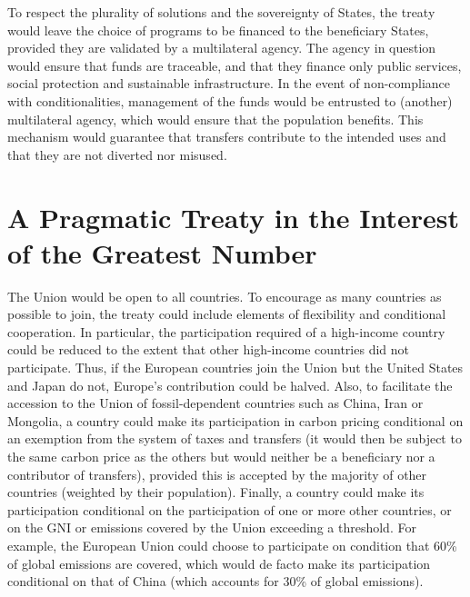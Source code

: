 \documentclass[12pt,english]{article}
\begin{document}
\begin{bibunit}
To respect the plurality of solutions and the sovereignty of States, the treaty would leave the choice of programs to be financed to the beneficiary States, provided they are validated by a multilateral agency. The agency in question would ensure that funds are traceable, and that they finance only public services, social protection and sustainable infrastructure. In the event of non-compliance with conditionalities, management of the funds would be entrusted to (another) multilateral agency, which would ensure that the population benefits. This mechanism would guarantee that transfers contribute to the intended uses and that they are not diverted nor misused.

\section{A Pragmatic Treaty in the Interest of the Greatest Number}
The Union would be open to all countries. To encourage as many countries as possible to join, the treaty could include elements of flexibility and conditional cooperation. In particular, the participation required of a high-income country could be reduced to the extent that other high-income countries did not participate. Thus, if the European countries join the Union but the United States and Japan do not, Europe's contribution could be halved. Also, to facilitate the accession to the Union of fossil-dependent countries such as China, Iran or Mongolia, a country could make its participation in carbon pricing conditional on an exemption from the system of taxes and transfers (it would then be subject to the same carbon price as the others but would neither be a beneficiary nor a contributor of transfers), provided this is accepted by the majority of other countries (weighted by their population). Finally, a country could make its participation conditional on the participation of one or more other countries, or on the GNI or emissions covered by the Union exceeding a threshold. For example, the European Union could choose to participate on condition that 60\% of global emissions are covered, which would de facto make its participation conditional on that of China (which accounts for 30\% of global emissions).


\end{bibunit}
\end{document}
